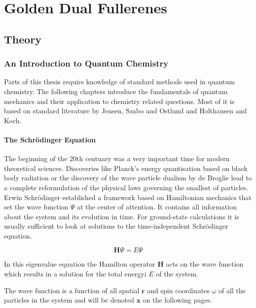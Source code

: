 
\part{Golden Dual Fullerenes}
\label{sec:goldendualfullerenes}


\chapter{Theory}
\label{sec:theorygold}

\section{An Introduction to Quantum Chemistry}

Parts of this thesis require knowledge of standard methods used in quantum
chemistry. The following chapters introduce the fundamentals of quantum
mechanics and their application to chemistry related questions. Most of it is
based on standard literature by Jensen\autocite{jensen_introduction_2006},
Szabo and Ostlund\autocite{szabo_modern_1996} and Holthausen and
Koch\autocite{koch_chemists_2001}.

\subsection{The Schr\"odinger Equation}

The beginning of the 20th centuary was a very important time for modern
theoretical sciences. Discoveries like Planck's energy quantisation based on
black body radiation or the discovery of the wave particle dualism by de
Broglie lead to a complete reformulation of the physical laws governing the
smallest of particles. Erwin Schr\"odinger established a framework based on
Hamiltonian mechanics that set the wave function $\Psi$ at the center of
attention. It contains all information about the system and its evolution in
time. For ground-state calculations it is usually sufficient to look at
solutions to the time-independent Schr\"odinger equation.

\begin{equation}
	\mathbf{H}\Psi=E\Psi\label{eqn:SchrodingerEquation}
\end{equation}

In this eigenvalue equation the Hamilton operator $\mathbf{H}$ acts on the wave
function which results in a solution for the total energyi $E$ of the system. 

The wave function is a function of all spatial $\mathbf{r}$ and spin
coordinates $\omega$ of all the particles in the system and will be denoted
$\mathbf{x}$ on the following pages.  

